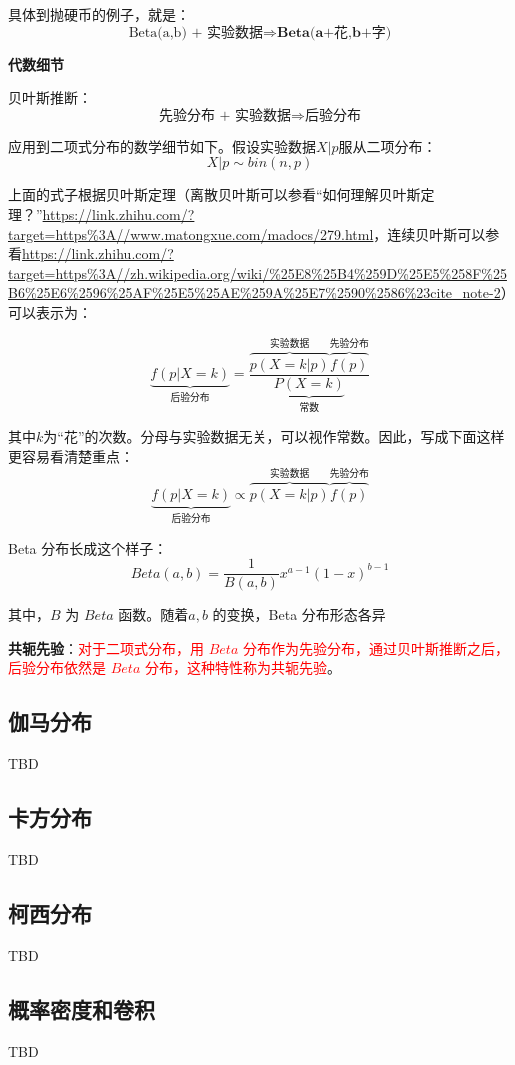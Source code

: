 \documentclass[12pt]{article}
\begin{document}
具体到抛硬币的例子，就是：
$$
\text{Beta(a,b) + 实验数据} \Rightarrow \textbf{Beta(a+花,b+字)} 
$$

\textbf{代数细节}

贝叶斯推断：
$$
\text{先验分布 + 实验数据} \Rightarrow \textbf{后验分布} 
$$

应用到二项式分布的数学细节如下。假设实验数据$X|p$服从二项分布：
$$
X|p \sim bin(n,p)
$$

上面的式子根据贝叶斯定理（离散贝叶斯可以参看“如何理解贝叶斯定理？”\url{https://link.zhihu.com/?target=https%3A//www.matongxue.com/madocs/279.html}，连续贝叶斯可以参看\url{https://link.zhihu.com/?target=https%3A//zh.wikipedia.org/wiki/%25E8%25B4%259D%25E5%258F%25B6%25E6%2596%25AF%25E5%25AE%259A%25E7%2590%2586%23cite_note-2}）可以表示为：

$$
\underbrace{f(p|X=k)}_{\text{后验分布}}= \frac{\overbrace{p(X=k|p)}^{\text{实验数据}}\overbrace{f(p)}^{\text{先验分布}}}{\underbrace{P(X=k)}_{\text{常数}}}
$$

其中$k$为“花”的次数。分母与实验数据无关，可以视作常数。因此，写成下面这样更容易看清楚重点：
$$
\underbrace{f(p|X=k)}_{\text{后验分布}} \propto \overbrace{p(X=k|p)}^{\text{实验数据}}\overbrace{f(p)}^{\text{先验分布}}
$$

Beta 分布长成这个样子：
$$
Beta(a,b) = \frac{1}{B(a,b)}x^{a-1}(1-x)^{b-1}
$$

其中，$B$ 为 $Beta$ 函数。随着$a,b$ 的变换，Beta 分布形态各异

\textbf{共轭先验}：\textcolor{red}{对于二项式分布，用 $Beta$ 分布作为先验分布，通过贝叶斯推断之后，后验分布依然是 $Beta$ 分布，这种特性称为共轭先验}。

\subsection{伽马分布}
TBD

\subsection{卡方分布}
TBD

\subsection{柯西分布}
TBD

\subsection{概率密度和卷积\cite{Think_Stats}}
TBD
\end{document}
